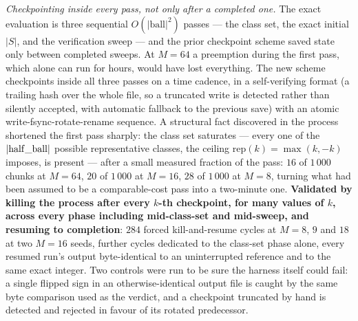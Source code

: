 \documentclass[11pt,a4paper]{article}
\theoremstyle{definition}
\theoremstyle{plain}
\begin{document}
\emph{Checkpointing inside every pass, not only after a completed one.} The exact evaluation is
three sequential $O(|\mathrm{ball}|^2)$ passes --- the class set, the exact initial $|S|$, and the
verification sweep --- and the prior checkpoint scheme saved state only between completed sweeps.
At $M=64$ a preemption during the first pass, which alone can run for hours, would have lost
everything. The new scheme checkpoints inside all three passes on a time cadence, in a
self-verifying format (a trailing hash over the whole file, so a truncated write is detected
rather than silently accepted, with automatic fallback to the previous save) with an atomic
write-fsync-rotate-rename sequence. A structural fact discovered in the process shortened the
first pass sharply: the class set saturates --- every one of the $|{\rm half\_ball}|$ possible
representative classes, the ceiling $\mathrm{rep}(k)=\max(k,-k)$ imposes, is present --- after a
small measured fraction of the pass: $16$ of $1\,000$ chunks at $M=64$, $20$ of $1\,000$ at
$M=16$, $28$ of $1\,000$ at $M=8$, turning what had been
assumed to be a comparable-cost pass into a two-minute one. \textbf{Validated by killing the
process after every $k$-th checkpoint, for many values of $k$, across every phase including
mid-class-set and mid-sweep, and resuming to completion}: $284$ forced kill-and-resume cycles at
$M=8$, $9$ and $18$ at two $M=16$ seeds, further cycles dedicated to the class-set phase alone,
every resumed run's output byte-identical to an uninterrupted reference and to the same exact
integer. Two controls were run to be sure the harness itself could fail: a single flipped sign in
an otherwise-identical output file is caught by the same byte comparison used as the verdict, and
a checkpoint truncated by hand is detected and rejected in favour of its rotated predecessor.
\end{document}
